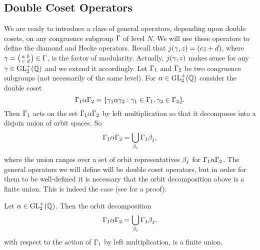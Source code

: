     \subsection*{Double Coset Operators}
      We are ready to introduce a class of general operators, depending upon double cosets, on any congruence subgroup $\Gamma$ of level $N$. We will use these operators to define the diamond and Hecke operators. Recall that $j(\gamma,z) = (cz+d)$, where $\gamma = \begin{psmallmatrix} a & b \\ c & d \end{psmallmatrix} \in \Gamma$, is the factor of modularity. Actually, $j(\gamma,z)$ makes sense for any $\gamma \in \mathrm{GL}_{2}^{+}(\mathbb{Q})$ and we extend it accordingly. Let $\Gamma_{1}$ and $\Gamma_{2}$ be two congruence subgroups (not necessarily of the same level). For $\alpha \in \mathrm{GL}_{2}^{+}(\mathbb{Q})$ consider the double coset
      \[
        \Gamma_{1}\alpha\Gamma_{2} = \{\gamma_{1}\alpha\gamma_{2}:\gamma_{1} \in \Gamma_{1}, \gamma_{2} \in \Gamma_{2}\}.
      \]
      Then $\Gamma_{1}$ acts on the set $\Gamma_{1}\alpha\Gamma_{2}$ by left multiplication so that it decomposes into a disjoin union of orbit spaces. So
      \[
        \Gamma_{1}\alpha\Gamma_{2} = \bigcup_{\beta_{j}}\Gamma_{1}\beta_{j},
      \]
      where the union ranges over a set of orbit representatives $\beta_{j}$ for $\Gamma_{1}\alpha\Gamma_{2}$. The general operators we will define will be double coset operators, but in order for them to be well-defined it is necessary that the orbit decomposition above is a finite union. This is indeed the case (see \cite{diamond2005first} for a proof):

      \begin{proposition}\label{prop:double_congruence_subgroup_coset_decomposition_is_finite}
        Let $\alpha \in \mathrm{GL}_{2}^{+}(\mathbb{Q})$. Then the orbit decomposition
        \[
          \Gamma_{1}\alpha\Gamma_{2} = \bigcup_{\beta_{j}}\Gamma_{1}\beta_{j},
        \]
        with respect to the action of $\Gamma_{1}$ by left multiplication, is a finite union.
      \end{proposition}

